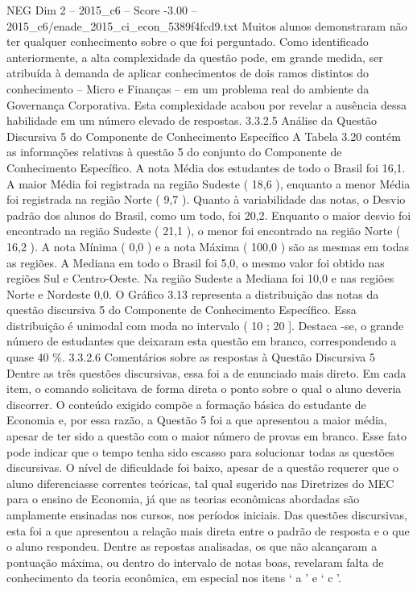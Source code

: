 \begin{textsample}{NEG Dim 2 – 2015\_c6 – Score -3.00 – 2015\_c6/enade\_2015\_ci\_econ\_5389f4fcd9.txt}
Muitos alunos demonstraram não ter qualquer conhecimento sobre o que foi perguntado.
Como identificado anteriormente, a alta complexidade da questão pode, em grande medida, ser atribuída à demanda de aplicar conhecimentos de dois ramos distintos do conhecimento – Micro e Finanças – em um problema real do ambiente da Governança Corporativa.
Esta complexidade acabou por revelar a ausência dessa habilidade em um número elevado de respostas. 3.3.2.5 Análise da Questão Discursiva 5 do Componente de Conhecimento Específico A Tabela 3.20 contém as informações relativas à questão 5 do conjunto do Componente de Conhecimento Específico.
A nota Média dos estudantes de todo o Brasil foi 16,1.
A maior Média foi registrada na região Sudeste ( 18,6 ), enquanto a menor Média foi registrada na região Norte ( 9,7 ).
Quanto à variabilidade das notas, o Desvio padrão dos alunos do Brasil, como um todo, foi 20,2.
Enquanto o maior desvio foi encontrado na região Sudeste ( 21,1 ), o menor foi encontrado na região Norte ( 16,2 ).
A nota Mínima ( 0,0 ) e a nota Máxima ( 100,0 ) são as mesmas em todas as regiões.
A Mediana em todo o Brasil foi 5,0, o mesmo valor foi obtido nas regiões Sul e Centro-Oeste.
Na região Sudeste a Mediana foi 10,0 e nas regiões Norte e Nordeste 0,0.
O Gráfico 3.13 representa a distribuição das notas da questão discursiva 5 do Componente de Conhecimento Específico.
Essa distribuição é unimodal com moda no intervalo ( 10 ; 20 ].
Destaca -se, o grande número de estudantes que deixaram esta questão em branco, correspondendo a quase 40 \%. 3.3.2.6 Comentários sobre as respostas à Questão Discursiva 5 Dentre as três questões discursivas, essa foi a de enunciado mais direto.
Em cada item, o comando solicitava de forma direta o ponto sobre o qual o aluno deveria discorrer.
O conteúdo exigido compõe a formação básica do estudante de Economia e, por essa razão, a Questão 5 foi a que apresentou a maior média, apesar de ter sido a questão com o maior número de provas em branco.
Esse fato pode indicar que o tempo tenha sido escasso para solucionar todas as questões discursivas.
O nível de dificuldade foi baixo, apesar de a questão requerer que o aluno diferenciasse correntes teóricas, tal qual sugerido nas Diretrizes do MEC para o ensino de Economia, já que as teorias econômicas abordadas são amplamente ensinadas nos cursos, nos períodos iniciais.
Das questões discursivas, esta foi a que apresentou a relação mais direta entre o padrão de resposta e o que o aluno respondeu.
Dentre as repostas analisadas, os que não alcançaram a pontuação máxima, ou dentro do intervalo de notas boas, revelaram falta de conhecimento da teoria econômica, em especial nos itens ‘ a ’ e ‘ c ’.

\end{textsample}
